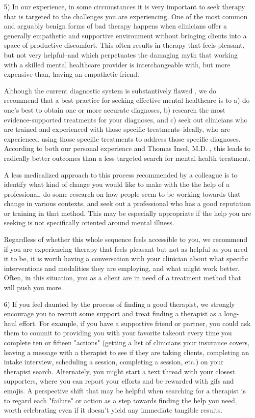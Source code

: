 \documentclass[12pt,letterpaper]{book}
\begin{document}
5) In our experience, in some circumstances it is very important to seek therapy that is targeted to the challenges you are experiencing. One of the most common and arguably benign forms of bad therapy happens when clinicians offer a generally empathetic and supportive environment without bringing clients into a space of productive discomfort. This often results in therapy that feels pleasant, but not very helpful--and which perpetuates the damaging myth that working with a skilled mental healthcare provider is interchangeable with, but more expensive than, having an empathetic friend.

Although the current diagnostic system is substantively flawed \cite{cohen2023need,eaton2023review}, we do recommend that a best practice for seeking effective mental healthcare is to a) do one's best to obtain one or more accurate diagnoses, b) research the most evidence-supported treatments for your diagnoses, and c) seek out clinicians who are trained and experienced with those specific treatments--ideally, who are experienced using those specific treatments to address those specific diagnoses. According to both our personal experience and Thomas Insel, M.D. \cite{eksIncel}, this leads to radically better outcomes than a less targeted search for mental health treatment.

A less medicalized approach to this process recommended by a colleague \cite{sinback} is to identify what kind of change you would like to make with the the help of a professional, do some research on how people seem to be working towards that change in various contexts, and seek out a professional who has a good reputation or training in that method. This may be especially appropriate if the help you are seeking is not specifically oriented around mental illness.

Regardless of whether this whole sequence feels accessible to you, we recommend if you are experiencing therapy that feels pleasant but not as helpful as you need it to be, it is worth having a conversation with your clinician about what specific interventions and modalities they are employing, and what might work better. Often, in this situation, you as a client are in need of a treatment method that will push you more.

6) If you feel daunted by the process of finding a good therapist, we strongly encourage you to recruit some support and treat finding a therapist as a long-haul effort.  For example, if you have a supportive friend or partner, you could ask them to commit to providing you with your favorite takeout every time you complete ten or fifteen "actions" (getting a list of clinicians your insurance covers, leaving a message with a therapist to see if they are taking clients, completing an intake interview, scheduling a session, completing a session, etc.) on your therapist search.  Alternately, you might start a text thread with your closest supporters, where you can report your efforts and be rewarded with gifs and emojis. A perspective shift that may be helpful when searching for a therapist is to regard each "failure" or action as a step towards finding the help you need, worth celebrating even if it doesn't yield any immediate tangible results.
\end{document}
